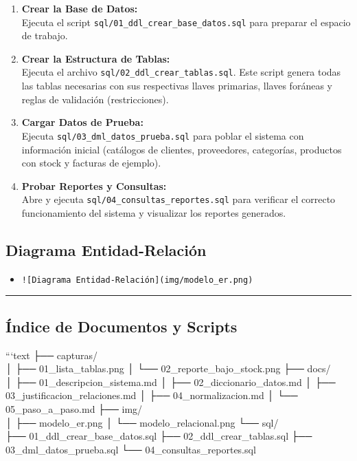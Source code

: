 \documentclass[
]{article}
\providecommand{\tightlist}{%
  \setlength{\itemsep}{0pt}\setlength{\parskip}{0pt}}
\begin{document}
\begin{enumerate}
\def\labelenumi{\arabic{enumi}.}
\item
  \textbf{Crear la Base de Datos:}\\
  Ejecuta el script \texttt{sql/01\_ddl\_crear\_base\_datos.sql} para
  preparar el espacio de trabajo.
\item
  \textbf{Crear la Estructura de Tablas:}\\
  Ejecuta el archivo \texttt{sql/02\_ddl\_crear\_tablas.sql}. Este
  script genera todas las tablas necesarias con sus respectivas llaves
  primarias, llaves foráneas y reglas de validación (restricciones).
\item
  \textbf{Cargar Datos de Prueba:}\\
  Ejecuta \texttt{sql/03\_dml\_datos\_prueba.sql} para poblar el sistema
  con información inicial (catálogos de clientes, proveedores,
  categorías, productos con stock y facturas de ejemplo).
\item
  \textbf{Probar Reportes y Consultas:}\\
  Abre y ejecuta \texttt{sql/04\_consultas\_reportes.sql} para verificar
  el correcto funcionamiento del sistema y visualizar los reportes
  generados.
\end{enumerate}

\subsection{Diagrama
Entidad-Relación}\label{diagrama-entidad-relaciuxf3n}

\begin{itemize}
\tightlist
\item
  \texttt{!{[}Diagrama\ Entidad-Relación{]}(img/modelo\_er.png)}
\end{itemize}

\begin{center}\rule{0.5\linewidth}{0.5pt}\end{center}

\subsection{Índice de Documentos y
Scripts}\label{uxedndice-de-documentos-y-scripts}

```text ├── capturas/\\
│ ├── 01\_lista\_tablas.png │ └── 02\_reporte\_bajo\_stock.png ├──
docs/\\
│ ├── 01\_descripcion\_sistema.md │ ├── 02\_diccionario\_datos.md │ ├──
03\_justificacion\_relaciones.md │ ├── 04\_normalizacion.md │ └──
05\_paso\_a\_paso.md ├── img/\\
│ ├── modelo\_er.png │ └── modelo\_relacional.png └── sql/\\
├── 01\_ddl\_crear\_base\_datos.sql ├── 02\_ddl\_crear\_tablas.sql ├──
03\_dml\_datos\_prueba.sql └── 04\_consultas\_reportes.sql
\end{document}
